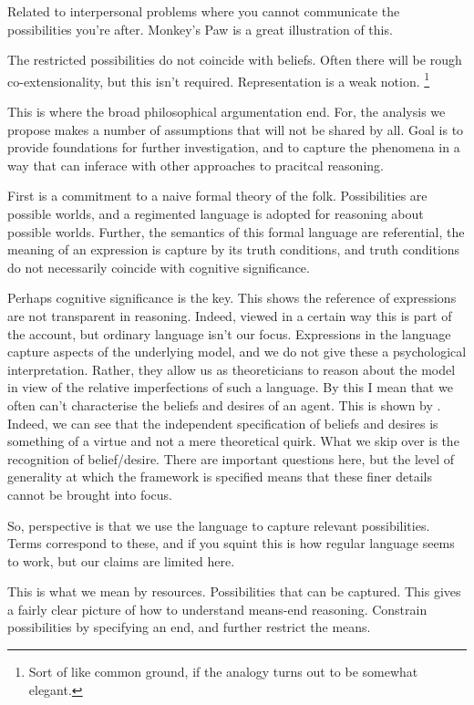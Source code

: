 \documentclass[10pt]{article}
\begin{document}
Related to interpersonal problems where you cannot communicate the possibilities you're after.
Monkey's Paw is a great illustration of this.

The restricted possibilities do not coincide with beliefs.
Often there will be rough co-extensionality, but this isn't required.
Representation is a weak notion.\nolinebreak
\footnote{Sort of like common ground, if the analogy turns out to be somewhat elegant.}


This is where the broad philosophical argumentation end.
For, the analysis we propose makes a number of assumptions that will not be shared by all.
Goal is to provide foundations for further investigation, and to capture the phenomena in a way that can inferace with other approaches to pracitcal reasoning.

First is a commitment to a naive formal theory of the folk.
Possibilities are possible worlds, and a regimented language is adopted for reasoning about possible worlds.
Further, the semantics of this formal language are referential, the meaning of an expression is capture by its truth conditions, and truth conditions do not necessarily coincide with cognitive significance.

Perhaps cognitive significance is the key.
This shows the reference of expressions are not transparent in reasoning.
Indeed, viewed in a certain way this is part of the account, but ordinary language isn't our focus.
Expressions in the language capture aspects of the underlying model, and we do not give these a psychological interpretation.
Rather, they allow us as theoreticians to reason about the model in view of the relative imperfections of such a language.
By this I mean that we often can't characterise the beliefs and desires of an agent.
This is shown by \citeauthor{Humberstone:2013aa}.
Indeed, we can see that the independent specification of beliefs and desires is something of a virtue and not a mere theoretical quirk.
What we skip over is the recognition of belief/desire.
There are important questions here, but the level of generality at which the framework is specified means that these finer details cannot be brought into focus.

So, perspective is that we use the language to capture relevant possibilities.
Terms correspond to these, and if you squint this is how regular language seems to work, but our claims are limited here.

This is what we mean by resources.
Possibilities that can be captured.
This gives a fairly clear picture of how to understand means-end reasoning.
Constrain possibilities by specifying an end, and further restrict the means.
\end{document}
